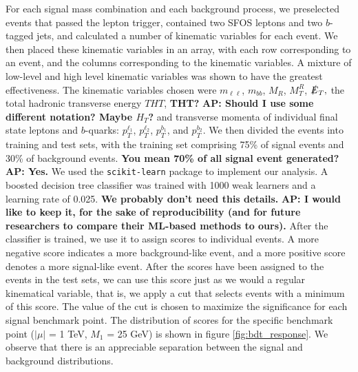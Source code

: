 \documentclass[a4paper,11pt]{article}
\newcommand{\Shufang}[1]{{\bf\color{Maroon}  #1}}
\newcommand{\Adarsh}[1]{{\bf\color{RoyalBlue} AP: #1}}
\begin{document}
For each signal mass combination and each background process, we preselected
events that passed the lepton trigger, contained two SFOS leptons and two
$b$-tagged jets, and calculated a number of kinematic variables for each event. We then
placed these kinematic variables in an array, with each row corresponding to an event, and
the columns corresponding to the kinematic variables. A mixture of low-level and high level
kinematic variables was shown to have the greatest effectiveness. The kinematic variables chosen were
$m_{\ell\ell}$, $m_{bb}$, $M_R$, $M_T^R$, $\slashed{E}_T,$ the total hadronic
transverse energy $THT$, \Shufang{THT?} \Adarsh{Should I use some different
notation? Maybe $H_T$?} and transverse momenta of individual final state
leptons and $b$-quarks: $p_T^{\ell_1}$, $p_T^{\ell_2}$, $p_T^{b_1}$, and $p_T^{b_2}$. We
then divided the events into training and test sets, with the training set
comprising 75\% of signal events and 30\% of background events. \Shufang{You
mean 70\% of all signal event generated?} \Adarsh{Yes.} We used the
\texttt{scikit-learn} package  \citep{Pedregosa2011} to implement our analysis.
A boosted decision tree classifier was trained with 1000 weak learners and a
learning rate of 0.025. \Shufang{We probably don't need this details.}
\Adarsh{I would like to keep it, for the sake of reproducibility (and for
future researchers to compare their ML-based methods to ours).}
After the classifier is trained, we use it to assign
scores to individual events. A more negative score indicates a more
background-like event, and a more positive score denotes a more signal-like
event. After the scores have been assigned to the events in the test sets, we
can use this score just as we would a regular kinematical variable, that is, we
apply a cut that selects events with a minimum of this score. The value of the
cut is chosen to maximize the significance for each signal benchmark point. The
distribution of scores for the specific benchmark point ($|\mu|$ = 1 TeV, $M_1$
= 25 GeV) is shown in figure \ref{fig:bdt_response}. We observe that there is an
appreciable separation between the signal and background distributions.
\end{document}
